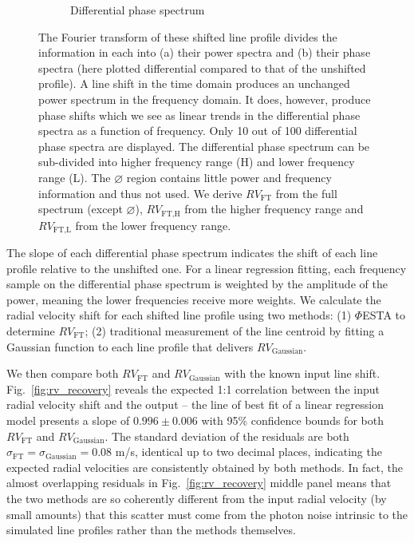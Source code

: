 \begin{figure}[tbp]
\begin{subfigure}[b]{0.49\textwidth}
        \caption{Differential phase spectrum}
        \label{fig:dps}
    \end{subfigure}	
    \caption[Fourier transform of 100 shifted line profiles]
    {The Fourier transform of these shifted line profile divides the information in each into (a) their power spectra and (b) their phase spectra (here plotted differential compared to that of the unshifted profile). A line shift in the time domain produces an unchanged power spectrum in the frequency domain. It does, however, produce phase shifts which we see as linear trends in the differential phase spectra as a function of frequency. Only 10 out of 100 differential phase spectra are displayed. The differential phase spectrum can be sub-divided into higher frequency range (H) and lower frequency range (L). The $\varnothing$ region contains little power and frequency information and thus not used. We derive $RV_\text{FT}$ from the full spectrum (except $\varnothing$), $RV_\text{FT,H}$ from the higher frequency range and $RV_\text{FT,L}$ from the lower frequency range.}
\label{fig:FT_process}
\end{figure}    

The slope of each differential phase spectrum indicates the shift of each line profile relative to the unshifted one. For a linear regression fitting, each frequency sample on the differential phase spectrum is weighted by the amplitude of the power, meaning the lower frequencies receive more weights. We calculate the radial velocity shift for each shifted line profile using two methods: (1) $\mathit{\Phi}$ESTA to determine $RV_\text{FT}$; (2) traditional measurement of the line centroid by fitting a Gaussian function to each line profile that delivers $RV_\text{Gaussian}$. 

We then compare both $RV_\text{FT}$ and $RV_\text{Gaussian}$ with the known input line shift. Fig.~\ref{fig:rv_recovery} reveals the expected 1:1 correlation between the input radial velocity shift and the output -- the line of best fit of a linear regression model presents a slope of $0.996\pm0.006$ with 95\% confidence bounds for both $RV_\text{FT}$ and $RV_\text{Gaussian}$. The standard deviation of the residuals are both $\sigma_\text{FT} = \sigma_\text{Gaussian} = 0.08$ m/s, identical up to two decimal places, indicating the expected radial velocities are consistently obtained by both methods. In fact, the almost overlapping residuals in Fig.~\ref{fig:rv_recovery} middle panel means that the two methods are so coherently different from the input radial velocity (by small amounts) that this scatter must come from the photon noise intrinsic to the simulated line profiles rather than the methods themselves. 

